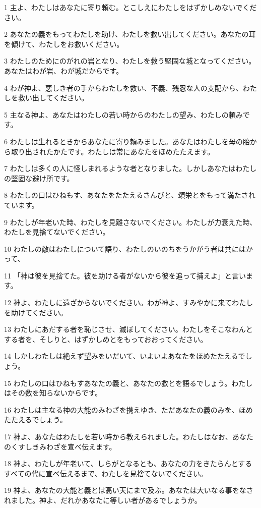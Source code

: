 \par 1 主よ、わたしはあなたに寄り頼む。とこしえにわたしをはずかしめないでください。
\par 2 あなたの義をもってわたしを助け、わたしを救い出してください。あなたの耳を傾けて、わたしをお救いください。
\par 3 わたしのためにのがれの岩となり、わたしを救う堅固な城となってください。あなたはわが岩、わが城だからです。
\par 4 わが神よ、悪しき者の手からわたしを救い、不義、残忍な人の支配から、わたしを救い出してください。
\par 5 主なる神よ、あなたはわたしの若い時からのわたしの望み、わたしの頼みです。
\par 6 わたしは生れるときからあなたに寄り頼みました。あなたはわたしを母の胎から取り出されたかたです。わたしは常にあなたをほめたたえます。
\par 7 わたしは多くの人に怪しまれるような者となりました。しかしあなたはわたしの堅固な避け所です。
\par 8 わたしの口はひねもす、あなたをたたえるさんびと、頌栄とをもって満たされています。
\par 9 わたしが年老いた時、わたしを見離さないでください。わたしが力衰えた時、わたしを見捨てないでください。
\par 10 わたしの敵はわたしについて語り、わたしのいのちをうかがう者は共にはかって、
\par 11 「神は彼を見捨てた。彼を助ける者がないから彼を追って捕えよ」と言います。
\par 12 神よ、わたしに遠ざからないでください。わが神よ、すみやかに来てわたしを助けてください。
\par 13 わたしにあだする者を恥じさせ、滅ぼしてください。わたしをそこなわんとする者を、そしりと、はずかしめとをもっておおってください。
\par 14 しかしわたしは絶えず望みをいだいて、いよいよあなたをほめたたえるでしょう。
\par 15 わたしの口はひねもすあなたの義と、あなたの救とを語るでしょう。わたしはその数を知らないからです。
\par 16 わたしは主なる神の大能のみわざを携えゆき、ただあなたの義のみを、ほめたたえるでしょう。
\par 17 神よ、あなたはわたしを若い時から教えられました。わたしはなお、あなたのくすしきみわざを宣べ伝えます。
\par 18 神よ、わたしが年老いて、しらがとなるとも、あなたの力をきたらんとするすべての代に宣べ伝えるまで、わたしを見捨てないでください。
\par 19 神よ、あなたの大能と義とは高い天にまで及ぶ。あなたは大いなる事をなされました。神よ、だれかあなたに等しい者があるでしょうか。
